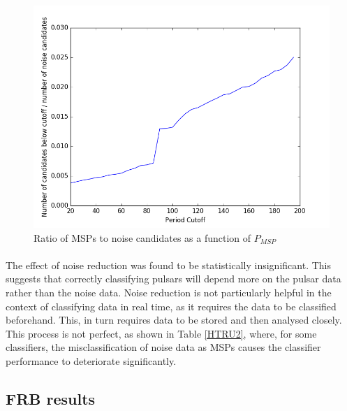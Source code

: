 \documentclass[12pt]{article}
\begin{document}
\begin{figure}[h!]
\begin{center}
\includegraphics[scale=0.5]{noise_ratio_vs_period_cutoff_zoom.png}
\caption{Ratio of MSPs to noise candidates as a function of $P_{MSP}$}
\label{noiseratiocutoff}
\end{center}
\end{figure}

\paragraph{}
The effect of noise reduction was found to be statistically insignificant. This suggests that correctly classifying pulsars will depend more on the pulsar data rather than the noise data. Noise reduction is not particularly helpful in the context of classifying data in real time, as it requires the data to be classified beforehand. This, in turn requires data to be stored and then analysed closely. This process is not perfect, as shown in Table \ref{HTRU2}, where, for some classifiers, the misclassification of noise data as MSPs causes the classifier performance to deteriorate significantly.

\subsection{FRB results}
\end{document}
